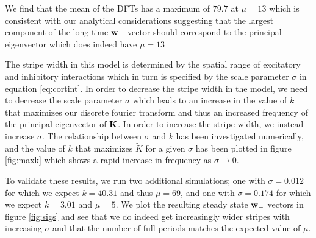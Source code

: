 \documentclass{article}
\begin{document}
We find that the mean of the DFTs has a maximum of $79.7$ at $\mu = 13$ which is consistent with our analytical considerations suggesting that the largest component of the long-time ${\bf w}_-$ vector should correspond to the principal eigenvector which does indeed have $\mu = 13$

The stripe width in this model is determined by the spatial range of excitatory and inhibitory interactions which in turn is specified by the scale parameter $\sigma$ in equation \ref{eq:cortint}.
In order to decrease the stripe width in the model, we need to decrease the scale parameter $\sigma$ which leads to an increase in the value of $k$ that maximizes our discrete fourier transform and thus an increased frequency of the principal eigenvector of $\bf K$. In order to increase the stripe width, we instead increase $\sigma$.
The relationship between $\sigma$ and $k$ has been investigated numerically, and the value of $k$ that maximizes $\tilde K$ for a given $\sigma$ has been plotted in figure \ref{fig:maxk} which shows a rapid increase in frequency as $\sigma \rightarrow 0$.

To validate these results, we run two additional simulations; one with $\sigma = 0.012$ for which we expect $k=40.31$ and thus $\mu = 69$, and one with $\sigma=0.174$ for which we expect $k=3.01$ and $\mu = 5$. We plot the resulting steady state ${\bf w}_-$ vectors in figure \ref{fig:sigs} and see that we do indeed get increasingly wider stripes with increasing $\sigma$ and that the number of full periods matches the expected value of $\mu$.
\end{document}

